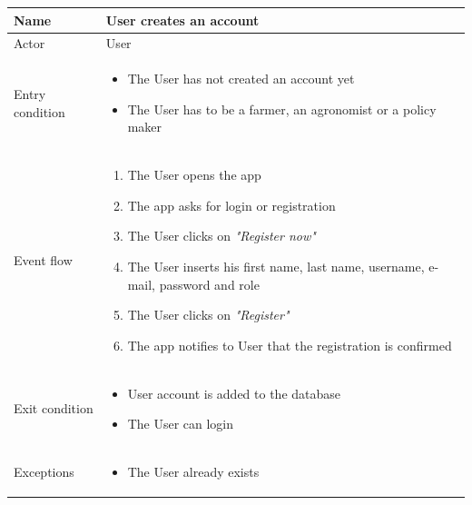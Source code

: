 \begin{table}[H]
    \begin{tabu} to \textwidth {|X|X[4]|}
        \hline
        Name            & User creates an account \\ \hline
        Actor           & User                    \\ \hline
        Entry condition & \begin{itemize}
            \item The User has not created an account yet
            \item The User has to be a farmer, an agronomist or a policy maker
        \end{itemize}  \\ \hline
        Event flow      & \begin{enumerate}
            \item The User opens the app
            \item The app asks for login or registration
            \item The User clicks on \emph{"Register now"}
            \item The User inserts his first name, last name, username, e-mail, password and role
            \item The User clicks on \emph{"Register"}
            \item The app notifies to User that the registration is confirmed
        \end{enumerate}  \\ \hline
        Exit condition  & \begin{itemize}
            \item User account is added to the database
            \item The User can login
        \end{itemize}  \\ \hline
        Exceptions      & \begin{itemize}
            \item The User already exists
        \end{itemize}  \\ \hline
    \end{tabu}
\end{table}

